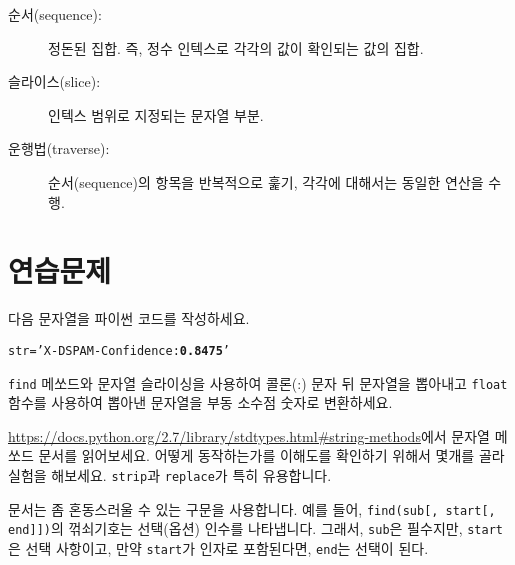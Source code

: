 \begin{description}
\item[순서(sequence):] 정돈된 집합. 즉, 정수 인텍스로 각각의 값이 확인되는 값의 집합.

\item[슬라이스(slice):] 인텍스 범위로 지정되는 문자열 부분.

\item[운행법(traverse):] 순서(sequence)의 항목을 반복적으로 훑기, 각각에 대해서는 동일한 연산을 수행.

\end{description}


\section{    연습문제}

\begin{ex}
다음 문자열을 파이썬 코드를 작성하세요.

\beforeverb
\begin{alltt}
str = 'X-DSPAM-Confidence: {\bf 0.8475}'
\end{alltt}
\afterverb

{\tt find} 메쏘드와 문자열 슬라이싱을 사용하여 콜론(:) 문자 뒤 문자열을 뽑아내고 
{\tt float} 함수를 사용하여 뽑아낸 문자열을 부동 소수점 숫자로 변환하세요.

\end{ex}


\begin{ex}

\url{https://docs.python.org/2.7/library/stdtypes.html#string-methods}에서 문자열 메쏘드 문서를 읽어보세요.
어떻게 동작하는가를 이해도를 확인하기 위해서 몇개를 골라 실험을 해보세요.
{\tt strip}과 {\tt replace}가 특히 유용합니다.

문서는 좀 혼동스러울 수 있는 구문을 사용합니다.
예를 들어, \verb"find(sub[, start[, end]])"의 꺾쇠기호는 선택(옵션) 인수를 나타냅니다.
그래서, {\tt sub}은 필수지만, {\tt start}은 선택 사항이고, 만약 {\tt start}가 인자로 포함된다면, {\tt end}는 선택이 된다.  
\end{ex}

